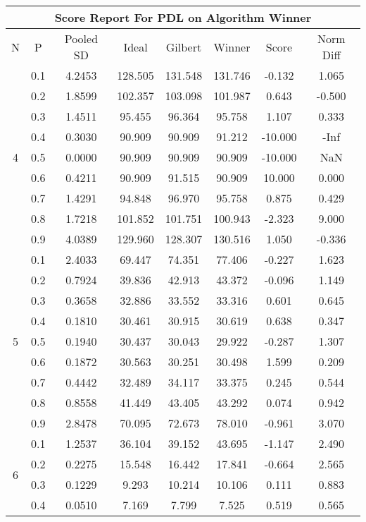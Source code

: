 \documentclass[11pt,a4paper]{report}
\begin{document}
\begin{longtable}{ | c | c || c | c | c | c | c | c | }
\hline
\multicolumn{8}{|c|}{ Score Report For PDL on Algorithm Winner} \\
\hline
N & P & Pooled SD &  Ideal &  Gilbert & Winner  & Score & Norm Diff \\
 \hline
 \hline
 \endhead
\multirow{9}{*}{4} & 0.1 & 4.2453 & 128.505 & 131.548 & 131.746 & -0.132 & 1.065 \\
 & 0.2 & 1.8599 & 102.357 & 103.098 & 101.987 & 0.643 & -0.500 \\
 & 0.3 & 1.4511 & 95.455 & 96.364 & 95.758 & 1.107 & 0.333 \\
 & 0.4 & 0.3030 & 90.909 & 90.909 & 91.212 & -10.000 & -Inf \\
 & 0.5 & 0.0000 & 90.909 & 90.909 & 90.909 & -10.000 & NaN \\
 & 0.6 & 0.4211 & 90.909 & 91.515 & 90.909 & 10.000 & 0.000 \\
 & 0.7 & 1.4291 & 94.848 & 96.970 & 95.758 & 0.875 & 0.429 \\
 & 0.8 & 1.7218 & 101.852 & 101.751 & 100.943 & -2.323 & 9.000 \\
 & 0.9 & 4.0389 & 129.960 & 128.307 & 130.516 & 1.050 & -0.336 \\
 \hline
\multirow{9}{*}{5} & 0.1 & 2.4033 & 69.447 & 74.351 & 77.406 & -0.227 & 1.623 \\
 & 0.2 & 0.7924 & 39.836 & 42.913 & 43.372 & -0.096 & 1.149 \\
 & 0.3 & 0.3658 & 32.886 & 33.552 & 33.316 & 0.601 & 0.645 \\
 & 0.4 & 0.1810 & 30.461 & 30.915 & 30.619 & 0.638 & 0.347 \\
 & 0.5 & 0.1940 & 30.437 & 30.043 & 29.922 & -0.287 & 1.307 \\
 & 0.6 & 0.1872 & 30.563 & 30.251 & 30.498 & 1.599 & 0.209 \\
 & 0.7 & 0.4442 & 32.489 & 34.117 & 33.375 & 0.245 & 0.544 \\
 & 0.8 & 0.8558 & 41.449 & 43.405 & 43.292 & 0.074 & 0.942 \\
 & 0.9 & 2.8478 & 70.095 & 72.673 & 78.010 & -0.961 & 3.070 \\
 \hline
\multirow{9}{*}{6} & 0.1 & 1.2537 & 36.104 & 39.152 & 43.695 & -1.147 & 2.490 \\
 & 0.2 & 0.2275 & 15.548 & 16.442 & 17.841 & -0.664 & 2.565 \\
 & 0.3 & 0.1229 & 9.293 & 10.214 & 10.106 & 0.111 & 0.883 \\
 & 0.4 & 0.0510 & 7.169 & 7.799 & 7.525 & 0.519 & 0.565 \\

\end{longtable}
\end{document}
